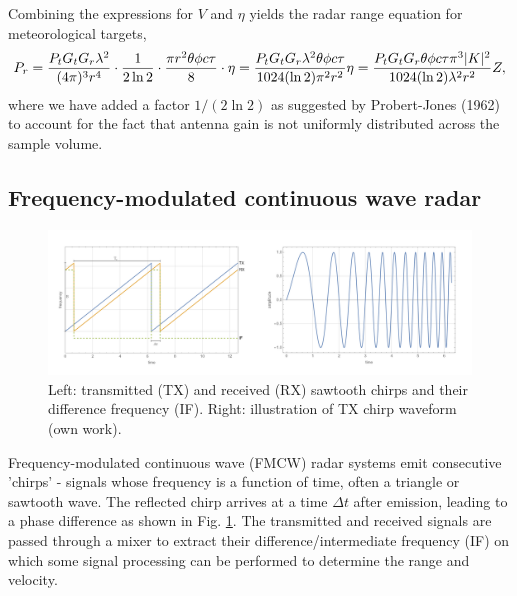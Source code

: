 \documentclass{article}
\DeclarePairedDelimiter\abs{\lvert}{\rvert}%
\begin{document}
Combining the expressions for \(V\) and \(\eta\) yields the radar range equation for meteorological targets,\supercite{RadarHandbookMeteo}
\begin{equation}
	P_r = \frac{P_t G_t G_r \lambda^2}{(4 \pi)^3 r^4} \cdot \frac{1}{2\ln{2}} \cdot \frac{\pi r^2 \theta \phi c \tau}{8} \cdot \eta = \frac{P_t G_t G_r \lambda^2 \theta \phi c \tau}{1024 (\ln{2}) \pi^2 r^2} \eta = \frac{P_t G_t G_r \theta \phi c \tau \pi^3 \abs{K}^2}{1024 (\ln{2}) \lambda^2 r^2} Z,
	\label{eqn:MeteoRange}
\end{equation}
where we have added a factor \(1/(2\ln{2})\) as suggested by Probert-Jones (1962)\supercite{ProbertJones} to account for the fact that antenna gain is not uniformly distributed across the sample volume.

\subsection{Frequency-modulated continuous wave radar}
\begin{figure}
	\centering
	\includegraphics[width=\textwidth]{chirp-2}
	\caption{Left: transmitted (TX) and received (RX) sawtooth chirps and their difference frequency (IF). Right: illustration of TX chirp waveform (own work).}
	\label{fig:Chirp}
\end{figure}

Frequency-modulated continuous wave (FMCW) radar systems emit consecutive 'chirps' - signals whose frequency is a function of time, often a triangle or sawtooth wave. The reflected chirp arrives at a time \(\Delta t\) after emission, leading to a phase difference as shown in Fig. \ref{fig:Chirp}. The transmitted and received signals are passed through a mixer to extract their difference/intermediate frequency (IF) on which some signal processing can be performed to determine the range and velocity.
\end{document}
